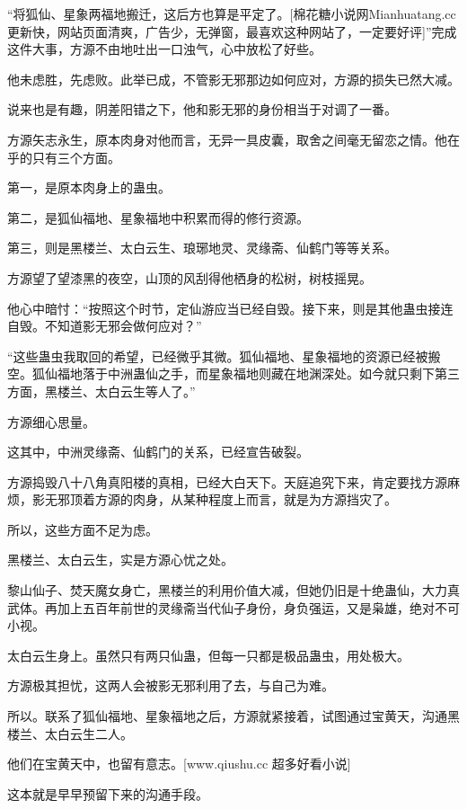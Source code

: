 
\begin{this_body}

“将狐仙、星象两福地搬迁，这后方也算是平定了。[棉花糖小说网Mianhuatang.cc更新快，网站页面清爽，广告少，无弹窗，最喜欢这种网站了，一定要好评]”完成这件大事，方源不由地吐出一口浊气，心中放松了好些。

他未虑胜，先虑败。此举已成，不管影无邪那边如何应对，方源的损失已然大减。

说来也是有趣，阴差阳错之下，他和影无邪的身份相当于对调了一番。

方源矢志永生，原本肉身对他而言，无异一具皮囊，取舍之间毫无留恋之情。他在乎的只有三个方面。

第一，是原本肉身上的蛊虫。

第二，是狐仙福地、星象福地中积累而得的修行资源。

第三，则是黑楼兰、太白云生、琅琊地灵、灵缘斋、仙鹤门等等关系。

方源望了望漆黑的夜空，山顶的风刮得他栖身的松树，树枝摇晃。

他心中暗忖：“按照这个时节，定仙游应当已经自毁。接下来，则是其他蛊虫接连自毁。不知道影无邪会做何应对？”

“这些蛊虫我取回的希望，已经微乎其微。狐仙福地、星象福地的资源已经被搬空。狐仙福地落于中洲蛊仙之手，而星象福地则藏在地渊深处。如今就只剩下第三方面，黑楼兰、太白云生等人了。”

方源细心思量。

这其中，中洲灵缘斋、仙鹤门的关系，已经宣告破裂。

方源捣毁八十八角真阳楼的真相，已经大白天下。天庭追究下来，肯定要找方源麻烦，影无邪顶着方源的肉身，从某种程度上而言，就是为方源挡灾了。

所以，这些方面不足为虑。

黑楼兰、太白云生，实是方源心忧之处。

黎山仙子、焚天魔女身亡，黑楼兰的利用价值大减，但她仍旧是十绝蛊仙，大力真武体。再加上五百年前世的灵缘斋当代仙子身份，身负强运，又是枭雄，绝对不可小视。

太白云生身上。虽然只有两只仙蛊，但每一只都是极品蛊虫，用处极大。

方源极其担忧，这两人会被影无邪利用了去，与自己为难。

所以。联系了狐仙福地、星象福地之后，方源就紧接着，试图通过宝黄天，沟通黑楼兰、太白云生二人。

他们在宝黄天中，也留有意志。[www.qiushu.cc 超多好看小说]

这本就是早早预留下来的沟通手段。


\end{this_body}

